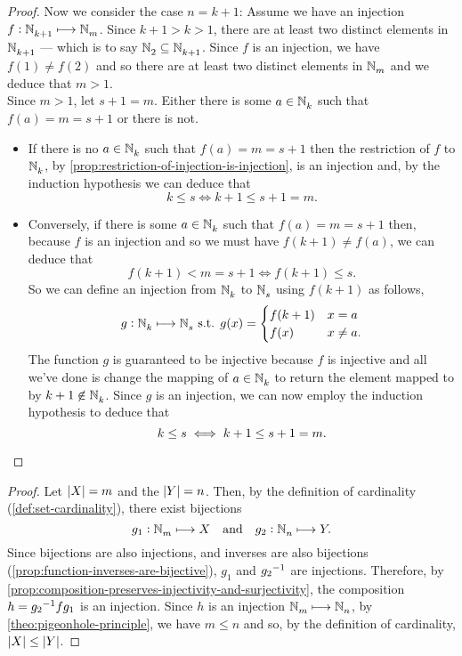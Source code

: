 \documentclass[../MathsNotesBase.tex]{subfiles}
\begin{document}
{\begin{proof}
			Now we consider the case ${ n = k+1 }$: Assume we have an injection ${ f: \mathbb{N}^{}_{k+1} \longmapsto \mathbb{N}^{}_m }$. Since ${ k+1 > k > 1 }$, there are at least two distinct elements in $\mathbb{N}^{}_{k+1}$ --- which is to say ${ \mathbb{N}^{}_2 \subseteq \mathbb{N}^{}_{k+1} }$. Since $f$ is an injection, we have ${ f(1) \neq f(2) }$ and so there are at least two distinct elements in $\mathbb{N}^{}_m$ and we deduce that ${ m > 1 }$.\\
			
			Since ${ m > 1 }$, let ${ s + 1 = m }$. Either there is some ${ a \in \mathbb{N}^{}_k }$ such that ${ f(a) = m = s+1 }$ or there is not.
			\begin{itemize}
				\item If there is no ${ a \in \mathbb{N}^{}_k }$ such that ${ f(a) = m = s+1 }$ then the restriction of $f$ to $\mathbb{N}^{}_k$, by \autoref{prop:restriction-of-injection-is-injection}, is an injection and, by the induction hypothesis we can deduce that
				\[ k \leq s \iff k + 1 \leq s + 1 = m. \]
				
				\bigskip
				\item Conversely, if there is some ${ a \in \mathbb{N}^{}_k }$ such that ${ f(a) = m = s+1 }$ then, because $f$ is an injection and so we must have ${ f(k+1) \neq f(a) }$, we can deduce that
				\[ f(k+1) < m = s+1 \iff f(k+1) \leq s. \]
				So we can define an injection from $\mathbb{N}^{}_k$ to $\mathbb{N}^{}_s$ using $f(k+1)$ as follows,
				\[	g: \mathbb{N}^{}_k \longmapsto \mathbb{N}^{}_s \text{ s.t. } g(x) = 	\begin{cases}
					f(k+1) & x = a \\
					f(x) & x \neq a.	
				\end{cases}
				\]
				The function $g$ is guaranteed to be injective because $f$ is injective and all we've done is change the mapping of ${ a \in \mathbb{N}^{}_k }$ to return the element mapped to by ${ k+1 \centernot\in \N{}_k }$. Since $g$ is an injection, we can now employ the induction hypothesis to deduce that
				\[ k \leq s \iff k + 1 \leq s + 1 = m. \qedhere \]
			\end{itemize}
		\end{proof}
		
		
		\bigskip
		\begin{proof}
			Let ${ \left\lvert X\right\rvert = m }$ and the ${ \left\lvert Y\right\rvert = n }$. Then, by the definition of cardinality (\ref{def:set-cardinality}), there exist bijections
			\[ g_1: \mathbb{N}^{}_m \longmapsto X \hspace{10pt}\text{and}\hspace{10pt} g_2: \mathbb{N}^{}_n \longmapsto Y. \]
			Since bijections are also injections, and inverses are also bijections (\autoref{prop:function-inverses-are-bijective}), $g_1$ and ${g_2}^{-1}$ are injections. Therefore, by \autoref{prop:composition-preserves-injectivity-and-surjectivity}, the composition ${ h = {g_2}^{-1} f g_1 }$ is an injection. Since $h$ is an injection ${ \mathbb{N}^{}_m \longmapsto \mathbb{N}^{}_n }$, by \autoref{theo:pigeonhole-principle}, we have ${ m \leq n }$ and so, by the definition of cardinality, ${ \left\lvert X\right\rvert \leq \left\lvert Y\right\rvert }$.
		\end{proof}
		
}
\end{document}
